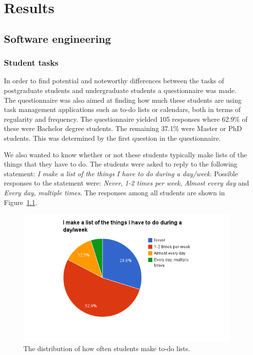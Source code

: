 \chapter{Results}
\label{chap:results}

\section{Software engineering}

\subsection{Student tasks}
\label{subsec:studenttasks}
In order to find potential and noteworthy differences between the tasks of postgraduate students and undergraduate students a questionnaire was made. The questionnaire was also aimed at finding how much these students are using task management applications such as to-do lists or calendars, both in terms of regularity and frequency. The questionnaire yielded 105 responses where 62.9\% of these were Bachelor degree students. The remaining 37.1\% were Master or PhD students. This was determined by the first question in the questionnaire.

We also wanted to know whether or not these students typically make lists of the things that they have to do. The students were asked to reply to the following statement: \emph{I make a list of the things I have to do during a day/week}. Possible responses to the statement were: \emph{Never}, \emph{1-2 times per week}, \emph{Almost every day} and \emph{Every day, multiple times}. The responses among all students are shown in Figure~\ref{fig:todolistusage}.
\begin{figure}[tbp]
  \centering
  \includegraphics[width=\textwidth]{figures/TodoListUsage.png}
  \caption[To-do list usage]{The distribution of how often students make to-do lists.}
  \label{fig:todolistusage}
\end{figure}

